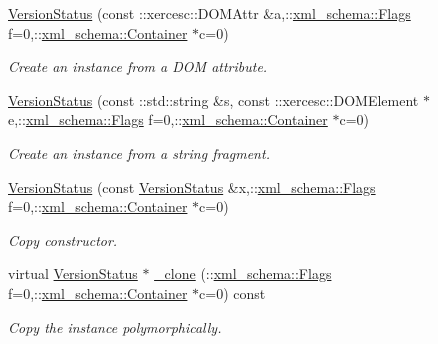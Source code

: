 \begin{DoxyCompactItemize}
\hyperlink{classopenstack_1_1xml_1_1VersionStatus_ad365cd4bde259c358d7e12f3150e64af}{VersionStatus} (const ::xercesc::DOMAttr \&a,::\hyperlink{namespacexml__schema_affb4c227cbd9aa7453dd1dc5a1401943}{xml\_\-schema::Flags} f=0,::\hyperlink{namespacexml__schema_a333dea2213742aea47a37532dec4ec27}{xml\_\-schema::Container} $\ast$c=0)
\begin{DoxyCompactList}\small\item\em Create an instance from a DOM attribute. \item\end{DoxyCompactList}\item 
\hyperlink{classopenstack_1_1xml_1_1VersionStatus_ae842da51248af493e741ec5a7db22f11}{VersionStatus} (const ::std::string \&s, const ::xercesc::DOMElement $\ast$e,::\hyperlink{namespacexml__schema_affb4c227cbd9aa7453dd1dc5a1401943}{xml\_\-schema::Flags} f=0,::\hyperlink{namespacexml__schema_a333dea2213742aea47a37532dec4ec27}{xml\_\-schema::Container} $\ast$c=0)
\begin{DoxyCompactList}\small\item\em Create an instance from a string fragment. \item\end{DoxyCompactList}\item 
\hyperlink{classopenstack_1_1xml_1_1VersionStatus_a9d0e94fd710a7092c4fc888d1ac22115}{VersionStatus} (const \hyperlink{classopenstack_1_1xml_1_1VersionStatus}{VersionStatus} \&x,::\hyperlink{namespacexml__schema_affb4c227cbd9aa7453dd1dc5a1401943}{xml\_\-schema::Flags} f=0,::\hyperlink{namespacexml__schema_a333dea2213742aea47a37532dec4ec27}{xml\_\-schema::Container} $\ast$c=0)
\begin{DoxyCompactList}\small\item\em Copy constructor. \item\end{DoxyCompactList}\item 
virtual \hyperlink{classopenstack_1_1xml_1_1VersionStatus}{VersionStatus} $\ast$ \hyperlink{classopenstack_1_1xml_1_1VersionStatus_a3ab041cf3599b7a1ea91bed544ae1a62}{\_\-clone} (::\hyperlink{namespacexml__schema_affb4c227cbd9aa7453dd1dc5a1401943}{xml\_\-schema::Flags} f=0,::\hyperlink{namespacexml__schema_a333dea2213742aea47a37532dec4ec27}{xml\_\-schema::Container} $\ast$c=0) const 
\begin{DoxyCompactList}\small\item\em Copy the instance polymorphically. \item\end{DoxyCompactList}\item 

\end{DoxyCompactItemize}
